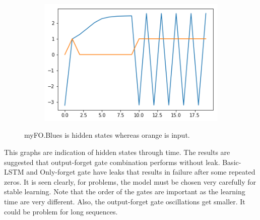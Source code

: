 \documentclass[12pt, letterpaper]{article}
\begin{document}
\begin{figure}[h]
\begin{subfigure}[b]{0.3\textwidth}
        \includegraphics[width=\textwidth]{of3}
        \label{fig:mouse}
    \end{subfigure}
    \caption{myFO.Blues is hidden states whereas orange is input.}
  \label{fig:animals}
\end{figure}

This graphs are indication of hidden states through time. The results are suggested that output-forget gate combination performs without leak. Basic-LSTM and Only-forget gate have leaks that results in failure after some repeated zeros. It is seen clearly, for problems, the model must be chosen very carefully for stable learning. Note that the order of the gates are important as the learning time are very different. Also, the output-forget gate oscillations get smaller. It could be problem for long sequences.
\end{document}
